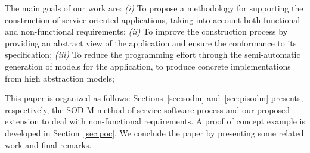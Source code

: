 The main goals of our work are:
\textit{(i)} To propose a methodology for supporting the construction of service-oriented applications, taking into account both functional and non-functional requirements;
\textit{(ii)} To improve the construction process by providing an abstract view of the application and ensure the conformance to its specification;
\textit{(iii)} To reduce the programming effort through the semi-automatic generation of  models for the application, to produce concrete implementations from high abstraction models;


\bigskip
This paper is organized as follows:
Sections~\ref{sec:sodm} and~\ref{sec:pisodm} presents, respectively, the SOD-M method of service software process and our proposed extension to deal with non-functional requirements.
A proof of concept example is developed in Section~\ref{sec:poc}.
We conclude the paper by presenting some related work and final remarks.
